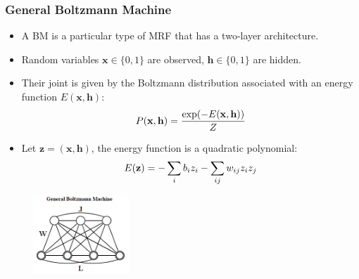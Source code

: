 \documentclass{beamer}
\begin{document}
\begin{frame}
\frametitle{General Boltzmann Machine}
\begin{itemize}
\item A BM is a particular type of MRF that has a two-layer architecture.
\item Random variables $\mathbf{x} \in \{0, 1\}$ are observed, $\mathbf{h} \in \{0, 1\}$ are hidden. 
\item Their joint is given by the Boltzmann distribution associated with an energy function $E(\mathbf{x}, \mathbf{h})$:
\begin{equation}\small
P(\mathbf{x, h}) = \frac{\exp(-E(\mathbf{x, h}))}{Z}
\end{equation}
\item Let $\mathbf{z}=(\mathbf{x}, \mathbf{h})$, the energy function is a quadratic polynomial:
\begin{equation}\small
E(\mathbf{z})=-\sum_i b_i z_i - \sum_{ij} w_{ij}z_iz_j
\end{equation}
\end{itemize}
\begin{figure}
\centering
  \includegraphics[width=0.32\textwidth]{figs/bm.png}
\end{figure}
\end{frame}

\end{document}
